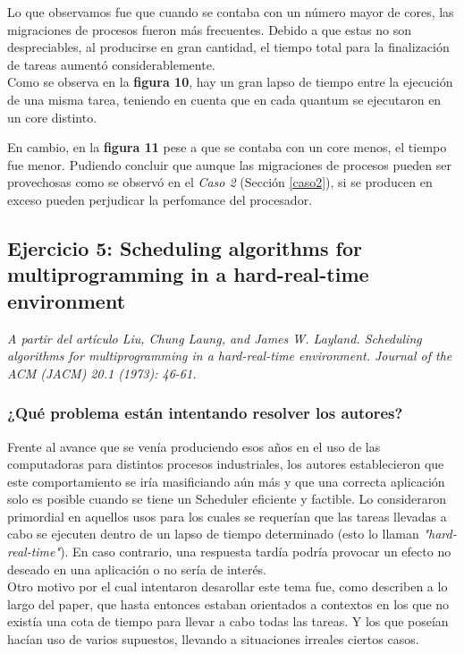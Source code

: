 \documentclass[a4paper]{article}
\begin{document}
 Lo que observamos fue que cuando se contaba con un número mayor de cores, las migraciones de procesos fueron m\'as frecuentes. Debido a que estas no son despreciables, al producirse en gran cantidad, el tiempo total para la finalización de tareas aumentó considerablemente. \\
 
 Como se observa en la \textbf{figura 10}, hay un gran lapso de tiempo entre la ejecución de una misma tarea, teniendo en cuenta que en cada quantum se ejecutaron en un core distinto. 
 
 En cambio, en la \textbf{figura 11} pese a que se contaba con un core menos, el tiempo fue menor. Pudiendo concluir que aunque las migraciones de procesos pueden ser provechosas como se observó en el \emph{Caso 2} (Secci\'on \ref{caso2}), si se producen en exceso pueden perjudicar la perfomance del procesador.  



\newpage

 \subsection{Ejercicio 5: Scheduling algorithms for multiprogramming in a hard-real-time environment}
 
\textit{A partir del art\'iculo Liu, Chung Laung, and James W. Layland. Scheduling algorithms for multiprogramming in a hard-real-time environment. Journal of the ACM (JACM) 20.1 (1973): 46-61.}


\subsubsection{¿Qu\'e problema est\'an intentando resolver los autores?}

Frente al avance que se ven\'ia produciendo esos años en el uso de las computadoras para distintos procesos industriales, los autores establecieron que este comportamiento se iría masificiando aún más y que una correcta aplicación solo es posible cuando se tiene un Scheduler eficiente y factible. Lo consideraron primordial en aquellos usos para los cuales se requerían que las tareas llevadas a cabo se ejecuten dentro de un lapso de tiempo determinado (esto lo llaman \textit{"hard-real-time"}). En caso contrario, una respuesta tardía podría provocar un efecto no deseado en una aplicación o no sería de interés. \\

Otro motivo por el cual intentaron desarollar este tema fue, como describen a lo largo del paper, que hasta entonces estaban orientados a contextos en los que no exist\'ia una cota de tiempo para llevar a cabo todas las tareas. Y los que pose\'ian hacían uso de varios supuestos, llevando a situaciones irreales ciertos casos. \\
\end{document}
